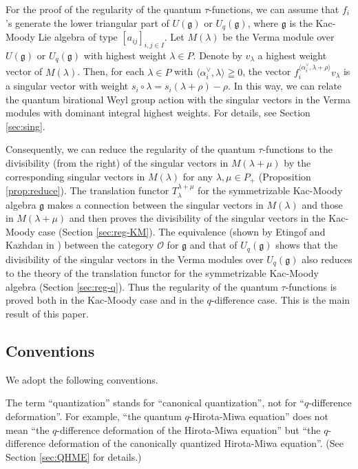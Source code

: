 \documentclass[12pt,twoside]{article}
\newcommand\bra{\langle}
\newcommand\ket{\rangle}
\renewcommand\O{{\mathcal O}}
\newcommand\av{\alpha^\vee}
\newcommand\g{{\mathfrak g}}
\theoremstyle{plain} %
\theoremstyle{definition} %
\theoremstyle{definition} %
\numberwithin{theorem}{section}
\numberwithin{equation}{section}
\numberwithin{figure}{section}
\numberwithin{table}{section}
\newcommand\secref[1]{Section \ref{#1}}
\newcommand\propref[1]{Proposition \ref{#1}}
\begin{document}
For the proof of the regularity of the quantum $\tau$-functions, 
we can assume that $f_i$'s generate the lower triangular part of $U(\g)$ or $U_q(\g)$,
where $\g$ is the Kac-Moody Lie algebra of type $[a_{ij}]_{i,j\in I}$.
Let $M(\lambda)$ be the Verma module over $U(\g)$ or $U_q(\g)$ 
with highest weight $\lambda\in P$.
Denote by $v_\lambda$ a highest weight vector of $M(\lambda)$.
Then, for each $\lambda\in P$ with $\bra\av_i,\lambda\ket\geqq0$, 
the vector $f_i^{\bra\av_i,\lambda+\rho\ket}v_\lambda$ 
is a singular vector with weight $s_i\circ\lambda=s_i(\lambda+\rho)-\rho$.
In this way, we can relate the quantum birational Weyl group action 
with the singular vectors in the Verma modules with dominant integral
highest weights.
For details, see \secref{sec:sing}.

Consequently, we can reduce the regularity of the quantum 
$\tau$-functions to the divisibility (from the right) of the singular vectors
in $M(\lambda+\mu)$ by the corresponding singular vectors in $M(\lambda)$ 
for any $\lambda,\mu\in P_+$ (\propref{prop:reduce}).
The translation functor $T_\lambda^{\lambda+\mu}$ 
for the symmetrizable Kac-Moody algebra $\g$
makes a connection between the singular vectors 
in $M(\lambda)$ and those in $M(\lambda+\mu)$
and then proves the divisibility of the singular vectors
in the Kac-Moody case (\secref{sec:reg-KM}).
The equivalence (shown by Etingof and Kazhdan in \cite{EK-VI})
between the category $\O$ for $\g$ and that of $U_q(\g)$
shows that the divisibility of the singular vectors 
in the Verma modules over $U_q(\g)$
also reduces to the theory of the translation functor 
for the symmetrizable Kac-Moody algebra (\secref{sec:reg-q}).
Thus the regularity of the quantum $\tau$-functions is proved
both in the Kac-Moody case and in the $q$-difference case. 
This is the main result of this paper.


\subsection{Conventions}

We adopt the following conventions.

The term ``quantization'' stands for ``canonical quantization'',
not for ``$q$-difference deformation''.
For example, ``the quantum $q$-Hirota-Miwa equation''
does not mean ``the $q$-difference deformation of the Hirota-Miwa equation''
but ``the $q$-difference deformation of the canonically quantized Hirota-Miwa equation''. 
(See \secref{sec:QHME} for details.)
\end{document}
